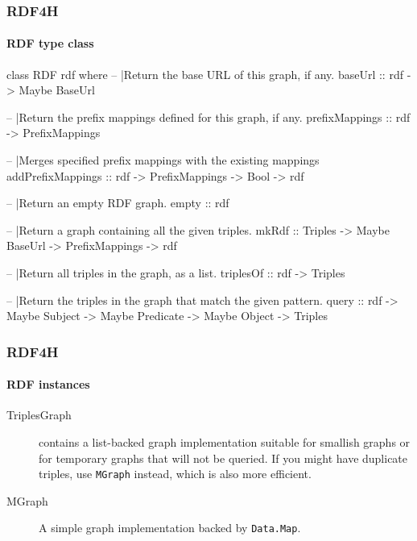 \documentclass{beamer}
\begin{document}
\begin{frame}[fragile]
\frametitle{RDF4H}
\framesubtitle{RDF type class}

\begin{haskellcode}
class RDF rdf where
  -- |Return the base URL of this graph, if any.
  baseUrl :: rdf -> Maybe BaseUrl

  -- |Return the prefix mappings defined for this graph, if any.
  prefixMappings :: rdf -> PrefixMappings

  -- |Merges specified prefix mappings with the existing mappings
  addPrefixMappings :: rdf -> PrefixMappings -> Bool -> rdf

  -- |Return an empty RDF graph.
  empty :: rdf

  -- |Return a graph containing all the given triples.
  mkRdf :: Triples -> Maybe BaseUrl -> PrefixMappings -> rdf

  -- |Return all triples in the graph, as a list.
  triplesOf :: rdf -> Triples

  -- |Return the triples in the graph that match the given pattern.
  query :: rdf -> Maybe Subject -> Maybe Predicate -> Maybe Object -> Triples
\end{haskellcode}

\end{frame}

\begin{frame}
\frametitle{RDF4H}
\framesubtitle{RDF instances}

\begin{description}
\item[TriplesGraph] contains a list-backed graph implementation
  suitable for smallish graphs or for temporary graphs that will not
  be queried. If you might have duplicate triples, use \texttt{MGraph}
  instead, which is also more efficient. 

\bigskip

\item[MGraph] A simple graph implementation backed by \texttt{Data.Map}.
\end{description}

\end{frame}
\end{document}
